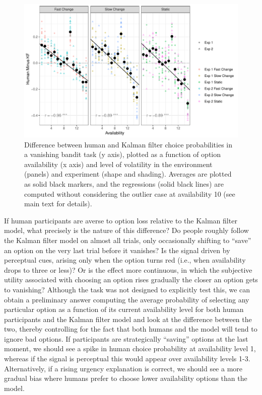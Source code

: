 \documentclass[a4paper,doc,natbib]{apa6}
\begin{document}
\begin{figure}[t]
\centering
\includegraphics[width=.9\textwidth]{modelvshuman_availdiff.pdf}
\caption{\small{Difference between human and Kalman filter choice probabilities in a vanishing bandit task (y axis), plotted as a function of option availability (x axis) and level of volatility in the environment (panels) and experiment (shape and shading). Averages are plotted as solid black markers, and the regressions (solid black lines) are computed without considering the outlier case at availability 10 (see main text for details). }}
\label{fig:modelhuman_avail}
\end{figure}

If human participants are averse to option loss relative to the Kalman filter model, what precisely is the nature of this difference? Do people roughly follow the Kalman filter model on almost all trials, only occasionally shifting to ``save'' an option on the very last trial before it vanishes? Is the signal driven by perceptual cues, arising only when the option turns red (i.e., when availability drops to three or less)? Or is the effect more continuous, in which the subjective utility associated with choosing an option rises gradually the closer an option gets to vanishing? Although the task was not designed to explicitly test this, we can obtain a preliminary answer computing the average probability of selecting any particular option as a function of its current availability level for both human participants and the Kalman filter model and look at the difference between the two, thereby controlling for the fact that both humans and the model will tend to ignore bad options. If participants are strategically ``saving'' options at the last moment, we should see a spike in human choice probability at availability level 1, whereas if the signal is perceptual this would appear over availability levels 1-3. Alternatively, if a rising urgency explanation is correct, we should see a more gradual bias where humans prefer to choose lower availability options than the model.
\end{document}
